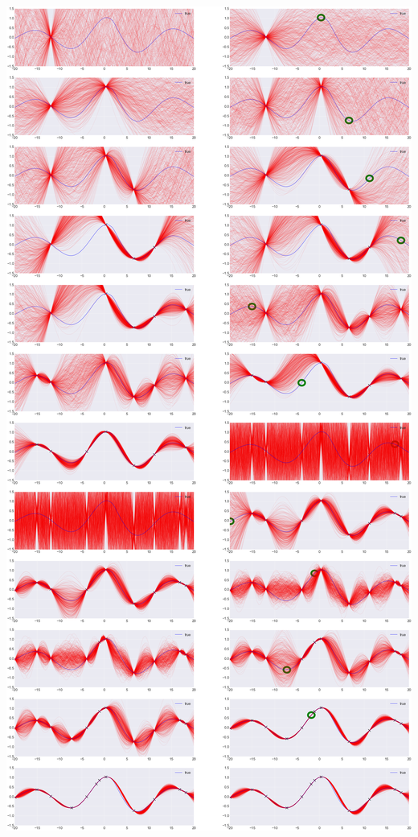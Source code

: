 \documentclass[a0,portrait]{a0poster}
\begin{document}
\begin{multicols}{3}
\includegraphics[width=20cm]{BayesOpt_gpmem_sequence.png}



\end{multicols}
\end{document}
